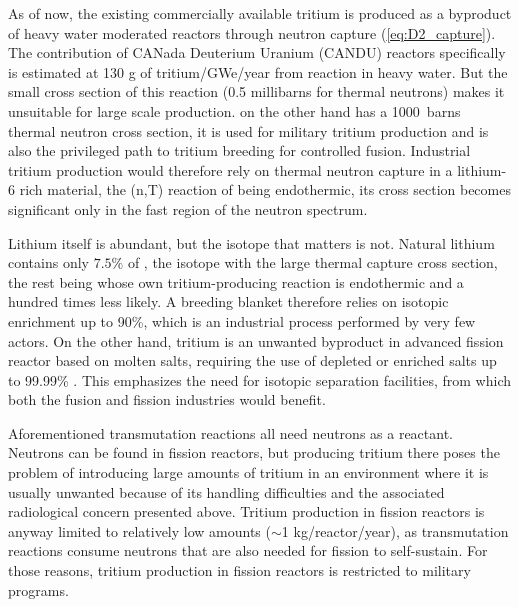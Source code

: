 \documentclass[a4paper,11pt,oneside]{report}
\begin{document}
As of now, the existing commercially available tritium is produced as a byproduct of heavy water moderated reactors through neutron capture (\cref{eq:D2_capture}). The contribution of CANada Deuterium Uranium (CANDU) reactors specifically is estimated at 130 g of tritium/GWe/year from  reaction in heavy water\cite{abdou_physics_2020}. But the small cross section of this reaction (0.5 millibarns for thermal neutrons) makes it unsuitable for large scale production.  on the other hand  has a 1000~barns thermal neutron cross section\cite{noauthor_janis_nodate}, it is used for military tritium production and is also the privileged path to tritium breeding for controlled fusion. Industrial tritium production would therefore rely on thermal neutron capture in a lithium-6 rich material, the (n,T) reaction of  being endothermic, its cross section becomes significant only in the fast region of the neutron spectrum.

Lithium itself is abundant, but the isotope that matters is not. Natural lithium contains only $7.5\%$ of , the isotope with the large thermal capture cross section, the rest being  whose own tritium-producing reaction is endothermic and a hundred times less likely. A breeding blanket therefore relies on isotopic  enrichment up to 90\%\cite{forsberg_fusion_2020}, which is an industrial process performed by very few actors. On the other hand, tritium is an unwanted byproduct in advanced fission reactor based on molten salts, requiring the use of  depleted or  enriched salts up to 99.99\% \cite{dolan_experimental_2023}. This emphasizes the need for isotopic separation facilities, from  which  both the fusion and fission industries would benefit\cite{forsberg_fusion_2020}.

Aforementioned transmutation reactions all need neutrons as a reactant. Neutrons can be found in fission reactors, but producing tritium there poses the problem of introducing large amounts of tritium in an environment where it is usually unwanted because of its handling difficulties and the associated radiological concern presented above. Tritium production in fission reactors is anyway limited to relatively low amounts ($\sim$1 kg/reactor/year\cite{abdou_physics_2020}), as transmutation reactions consume neutrons that are also needed for fission to self-sustain. For those reasons, tritium production in fission reactors is restricted to military programs.
\end{document}
